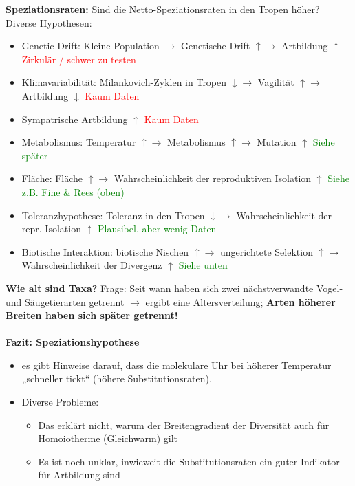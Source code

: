 \textbf{Speziationsraten:} Sind die Netto-Speziationsraten in den Tropen höher? Diverse Hypothesen:
\begin{itemize}
	\item Genetic Drift: Kleine Population $\rightarrow$ Genetische
Drift $\uparrow \rightarrow$ Artbildung $\uparrow$ \textcolor{red}{Zirkulär / schwer zu testen}
	\item Klimavariabilität: Milankovich-Zyklen in Tropen $\downarrow \rightarrow$ Vagilität $\uparrow \rightarrow$ Artbildung $\downarrow$ \textcolor{red}{Kaum Daten}
	\item Sympatrische Artbildung $\uparrow$ \textcolor{red}{Kaum Daten}
	\item Metabolismus: Temperatur $\uparrow \rightarrow$ Metabolismus $\uparrow \rightarrow$ Mutation $\uparrow$ \textcolor{green}{Siehe später}
	\item Fläche: Fläche $\uparrow \rightarrow$ Wahrscheinlichkeit der reproduktiven Isolation $\uparrow$ \textcolor{green}{Siehe z.B. Fine \& Rees (oben)}
	\item Toleranzhypothese: Toleranz in den Tropen $\downarrow \rightarrow$ Wahrscheinlichkeit der repr. Isolation $\uparrow$ \textcolor{green}{Plausibel, aber wenig Daten}
	\item Biotische Interaktion: biotische Nischen $\uparrow \rightarrow$ ungerichtete Selektion $\uparrow \rightarrow$ Wahrscheinlichkeit der Divergenz $\uparrow$ \textcolor{green}{Siehe unten}
\end{itemize}

\textbf{Wie alt sind Taxa?} Frage: Seit wann haben sich zwei nächstverwandte Vogel- und Säugetierarten getrennt $\rightarrow$ ergibt eine Altersverteilung; \textbf{Arten höherer Breiten haben sich später getrennt!}
\\\\
\textbf{Fazit: Speziationshypothese}
\begin{itemize}
	\item es gibt Hinweise darauf, dass die molekulare Uhr bei höherer Temperatur „schneller tickt“ (höhere Substitutionsraten).
	\item Diverse Probleme:
	\begin{itemize}
		\item Das erklärt nicht, warum der Breitengradient der Diversität auch für Homoiotherme (Gleichwarm) gilt
		\item Es ist noch unklar, inwieweit die Substitutionsraten ein guter Indikator für Artbildung sind
	\end{itemize}
\end{itemize}

